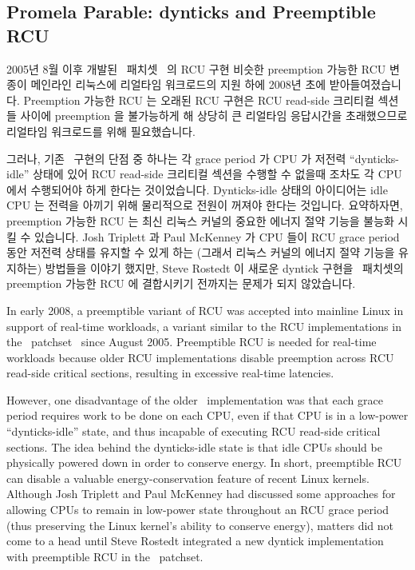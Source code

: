 

\subsection{Promela Parable: dynticks and Preemptible RCU}
\label{sec:formal:Promela Parable: dynticks and Preemptible RCU}

2005년 8월 이후 개발된 \rt\ 패치셋~\cite{IngoMolnar05a} 의 RCU 구현 비슷한
preemption 가능한 RCU 변종이 메인라인 리눅스에 리얼타임 워크로드의 지원 하에
2008년 초에 받아들여졌습니다.
Preemption 가능한 RCU 는 오래된 RCU 구현은 RCU read-side 크리티컬 섹션들 사이에
preemption 을 불가능하게 해 상당히 큰 리얼타임 응답시간을 초래했으므로 리얼타임
워크로드를 위해 필요했습니다.

그러나, 기존 \rt\ 구현의 단점 중 하나는 각 grace period 가 CPU 가 저전력
``dynticks-idle'' 상태에 있어 RCU read-side 크리티컬 섹션을 수행할 수 없을때
조차도 각 CPU 에서 수행되어야 하게 한다는 것이었습니다.
Dynticks-idle 상태의 아이디어는 idle CPU 는 전력을 아끼기 위해 물리적으로
전원이 꺼져야 한다는 것입니다.
요약하자면, preemption 가능한 RCU 는 최신 리눅스 커널의 중요한 에너지 절약
기능을 불능화 시킬 수 있습니다.
Josh Triplett 과 Paul McKenney 가 CPU 들이 RCU grace period 동안 저전력 상태를
유지할 수 있게 하는 (그래서 리눅스 커널의 에너지 절약 기능을 유지하는) 방법들을
이야기 했지만, Steve Rostedt 이 새로운 dyntick 구현을 \rt\ 패치셋의 preemption
가능한 RCU 에 결합시키기 전까지는 문제가 되지 않았습니다.

\iffalse

In early 2008, a preemptible variant of RCU was accepted into
mainline Linux in support of real-time workloads,
a variant similar to the RCU implementations in
the \rt\ patchset~\cite{IngoMolnar05a}
since August 2005.
Preemptible RCU is needed for real-time workloads because older
RCU implementations disable preemption across RCU read-side
critical sections, resulting in excessive real-time latencies.

However, one disadvantage of the older \rt\ implementation
was that each grace period
requires work to be done on each CPU, even if that CPU is in a low-power
``dynticks-idle'' state,
and thus incapable of executing RCU read-side critical sections.
The idea behind the dynticks-idle state is that idle CPUs
should be physically powered down in order to conserve energy.
In short, preemptible RCU can disable a valuable energy-conservation
feature of recent Linux kernels.
Although Josh Triplett and Paul McKenney
had discussed some approaches for allowing
CPUs to remain in low-power state throughout an RCU grace period
(thus preserving the Linux kernel's ability to conserve energy), matters
did not come to a head until Steve Rostedt integrated a new dyntick
implementation with preemptible RCU in the \rt\ patchset.


